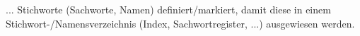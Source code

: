 
... Stichworte (Sachworte, Namen) definiert/markiert, damit diese in einem Stichwort-/Namensverzeichnis (Index, Sachwortregister, ...) ausgewiesen werden.
